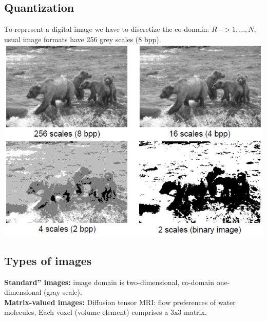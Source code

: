 \documentclass{article}
\begin{document}
\subsection{Quantization}
To represent a digital image we have to discretize the co-domain: $R->{1,...,N}$, usual image formats have 256 grey scales (8 bpp).\\
\includegraphics[scale=0.7]{14.png}
\subsection{Types of images}
\textbf{Standard” images:} image domain is two-dimensional, co-domain one-dimensional (gray scale).\\
\textbf{Matrix-valued images: }Diffusion tensor MRI: flow preferences of water molecules, Each voxel (volume element) comprises a 3x3 matrix.\\
\end{document}
